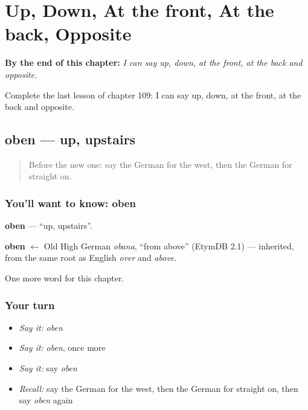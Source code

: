 
\chapter{Up, Down, At the front, At the back, Opposite}
\label{ch:ge-up-down-at-the-front-at-the-back-opposite}

\begin{chapteropening}
\textbf{By the end of this chapter:} \emph{I can say up, down, at the front, at the back and opposite.}

Complete the last lesson of chapter 109: I can say up, down, at the front, at the back and opposite.
\end{chapteropening}

\section[oben]{oben — up, upstairs}

\label{lesson:GE-C109-oben}



\begin{quote}
Before the new one: say the German for the west, then the German for straight on.
\end{quote}

\subsection*{You'll want to know: oben}
\textbf{oben} — \textquotedblleft{}up, upstairs\textquotedblright{}.

\begin{cousinweb}
\textbf{oben} $\leftarrow$ Old High German \emph{obana}, \textquotedblleft{}from above\textquotedblright{} (EtymDB 2.1) — inherited, from the same root as English \emph{over} and \emph{above}.
\end{cousinweb}

\begin{grammarlens}[title={What you've built}]
One more word for this chapter.
\end{grammarlens}

\subsection*{Your turn}
\begin{itemize}
\raggedright
  \item \emph{Say it:} \emph{oben}
  \item \emph{Say it:} \emph{oben}, once more
  \item \emph{Say it:} say \emph{oben}
  \item \emph{Recall:} say the German for the west, then the German for straight on, then say \emph{oben} again
\end{itemize}

